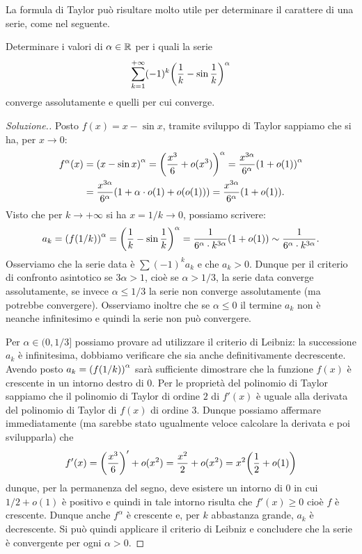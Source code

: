 La formula di Taylor può risultare molto utile per determinare il carattere di una serie, come nel seguente.
\begin{exercise}
Determinare i valori di $\alpha \in {\mathbb R}$ per i quali la serie
\[
  \sum_{k=1}^{+\infty}(-1)^k {\left( \frac 1 k - \sin \frac 1 k \right)}^\alpha
\]
converge assolutamente e quelli per cui converge.
\end{exercise}
\begin{proof}[Soluzione.]
Posto $f(x) = x - \sin x$,
tramite sviluppo di Taylor sappiamo che si ha,
per $x\to 0$:
\begin{align*}
   f^\alpha(x) &= {\left( x - \sin x \right)}^\alpha
   =  {\left( \frac{x^3}{6} + o(x^3) \right)}^\alpha
   = \frac{x^{3\alpha}}{6^\alpha}{\left( 1+o(1) \right)}^\alpha\\
   & = \frac{x^{3\alpha}}{6^\alpha}{\left( 1 + \alpha \cdot o(1) + o(o(1)) \right)}
   = \frac{x^{3\alpha}}{6^\alpha}{\left( 1 + o(1) \right)}.
\end{align*}
Visto che per $k\to +\infty$ si ha $x=1/k \to 0$, possiamo
scrivere:
\[
  a_k = {\left( f(1/k) \right)}^\alpha = {\left( \frac 1 k - \sin \frac 1 k \right)}^\alpha
  = \frac{1}{6^\alpha \cdot k^{3\alpha}} {\left( 1+o(1) \right)}
  \sim \frac{1}{6^\alpha \cdot k^{3\alpha}}.
\]
Osserviamo che la serie data è $\sum (-1)^k a_k$ e che $a_k>0$. Dunque per
il criterio di confronto asintotico se $3\alpha > 1$, cioè se $\alpha >1/3$,
la serie data converge assolutamente, se invece $\alpha \le 1/3$ la serie non
converge assolutamente (ma potrebbe convergere).
Osserviamo inoltre che se $\alpha \le 0$ il termine $a_k$ non è neanche
infinitesimo e quindi la serie non può convergere.

Per $\alpha \in (0,1/3]$ possiamo provare ad utilizzare il criterio di Leibniz:
la successione $a_k$ è infinitesima, dobbiamo verificare che sia anche
definitivamente decrescente.
Avendo posto $a_k = {\left( f(1/k) \right)}^\alpha$ sarà sufficiente dimostrare che
la funzione $f(x)$ è crescente in un intorno destro di $0$.
Per le proprietà del polinomio di Taylor sappiamo che il polinomio di Taylor
di ordine $2$ di $f'(x)$ è uguale alla derivata del polinomio di Taylor di
$f(x)$ di ordine $3$. Dunque possiamo affermare immediatamente (ma sarebbe
stato ugualmente veloce calcolare la derivata e poi svilupparla) che
\[
  f'(x)
  = {\left( \frac{x^3}{6} \right)}'  + o(x^2)
  = \frac{x^2}{2} + o(x^2) = x^2 {\left( \frac 1 2 + o(1) \right)}
\]
dunque, per la permanenza del segno, deve esistere un intorno di $0$ in cui
$1/2 + o(1)$ è positivo e quindi in tale intorno risulta che $f'(x)\ge 0$
cioè $f$ è crescente.
Dunque anche $f^\alpha$ è crescente e, per $k$ abbastanza grande,
$a_k$ è decrescente. Si può quindi applicare il criterio di Leibniz e
concludere che la serie è convergente per ogni $\alpha >0$.
\end{proof}

